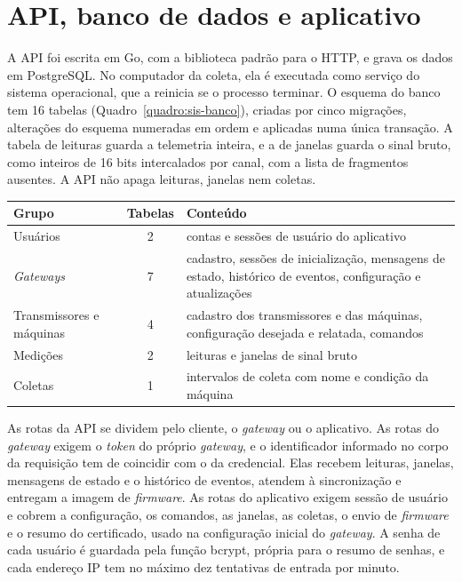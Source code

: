 \section{API, banco de dados e aplicativo}\label{sec:sis-api}

A API foi escrita em Go, com a biblioteca padrão para o HTTP, e grava os dados em PostgreSQL. No computador da coleta, ela é executada como serviço do sistema operacional, que a reinicia se o processo terminar. O esquema do banco tem \num{16} tabelas (Quadro~\ref{quadro:sis-banco}), criadas por cinco migrações, alterações do esquema numeradas em ordem e aplicadas numa única transação. A tabela de leituras guarda a telemetria inteira, e a de janelas guarda o sinal bruto, como inteiros de \num{16} bits intercalados por canal, com a lista de fragmentos ausentes. A API não apaga leituras, janelas nem coletas.

\begin{quadro}[!htb]
\centering\small
\caption{Tabelas do banco de dados da API}\label{quadro:sis-banco}
\begin{tabular}{@{}>{\raggedright\arraybackslash}p{36mm}c>{\raggedright\arraybackslash}p{96mm}@{}}
\toprule
Grupo & Tabelas & Conteúdo \\
\midrule
Usuários & 2 & contas e sessões de usuário do aplicativo \\
\addlinespace
\textit{Gateways} & 7 & cadastro, sessões de inicialização, mensagens de estado, histórico de eventos, configuração e atualizações \\
\addlinespace
Transmissores e máquinas & 4 & cadastro dos transmissores e das máquinas, configuração desejada e relatada, comandos \\
\addlinespace
Medições & 2 & leituras e janelas de sinal bruto \\
\addlinespace
Coletas & 1 & intervalos de coleta com nome e condição da máquina \\
\bottomrule
\end{tabular}
\end{quadro}

As rotas da API se dividem pelo cliente, o \textit{gateway} ou o aplicativo. As rotas do \textit{gateway} exigem o \textit{token} do próprio \textit{gateway}, e o identificador informado no corpo da requisição tem de coincidir com o da credencial. Elas recebem leituras, janelas, mensagens de estado e o histórico de eventos, atendem à sincronização e entregam a imagem de \textit{firmware}. As rotas do aplicativo exigem sessão de usuário e cobrem a configuração, os comandos, as janelas, as coletas, o envio de \textit{firmware} e o resumo do certificado, usado na configuração inicial do \textit{gateway}. A senha de cada usuário é guardada pela função bcrypt, própria para o resumo de senhas, e cada endereço IP tem no máximo dez tentativas de entrada por minuto.

